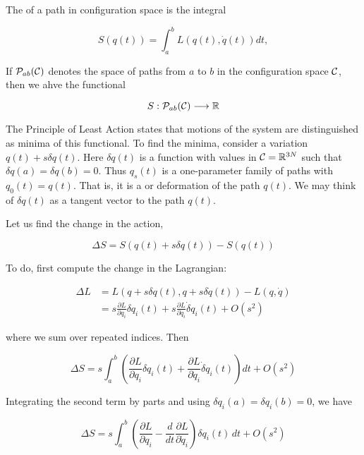 The  of a path in configuration space is the integral

\begin{equation}
S(q(t)) = \int_a^bL(q(t), \dot q(t)) dt,
\end{equation}

If $\mathcal{P}_{ab}(\mathcal{C})$ denotes the space of paths from $a$ to $b$ in
the configuration space $\mathcal{C}$, then we ahve the functional

\begin{equation}
S: \mathcal{P}_{ab}(\mathcal{C}) \longrightarrow \mathbb{R}
\end{equation}

The Principle of Least Action states that motions of the system are distinguished as minima of this functional.  To find the minima, consider a variation $q(t) + s\delta q(t)$.  Here $\delta q(t)$ is a function with values in $\mathcal{C} = \mathbb{R}^{3N}$ such that $\delta q(a) = \delta q(b) = 0$. Thus  $q_s(t)$ is a one-parameter family of paths with $q_0(t) = q(t)$.  That is, it is a  or deformation of the path $q(t)$. We may think of $\delta q(t)$ as a tangent vector to the path $q(t)$.

Let us find the change in the action,

\begin{equation}
\Delta S = S(q(t) + s\delta q(t)) - S(q(t))
\end{equation}

To do, first compute the change in the Lagrangian:

\begin{align}
\Delta L &= L(q + s \delta q(t), q + s \delta \dot q(t)) - L(q, \dot q) \\
&= s\frac{\partial L}{\partial q_i}\delta q_i(t)
 + s\frac{\partial L}{\partial \dot q_i}\dot \delta q_i(t) + O(s^2)
\end{align}

where we sum over repeated indices.
Then

\begin{equation}
\Delta S = s\int_a^b\left(\frac{\partial L}{\partial q_i}\delta q_i(t)
 + \frac{\partial L}{\partial \dot q_i}\dot \delta q_i(t)\right) dt + O(s^2)
\end{equation}

Integrating the second term by parts and using $\delta q_i(a) = \delta q_i(b) = 0$,
we have

\begin{equation}
\label{actionvariation}
\Delta S =  s\int_a^b\left(\frac{\partial L}{\partial q_i}
 - \frac{d}{dt} \frac{\partial L}{\partial \dot q_i}\right)\delta q_i(t)\, dt + O(s^2)
\end{equation}

